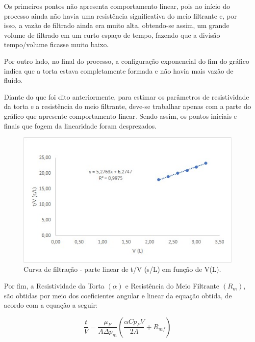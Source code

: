 Os primeiros pontos não apresenta comportamento linear, pois no início do processo ainda não havia uma resistência significativa do meio filtrante e, por isso, a vazão de filtrado ainda era muito alta, obtendo-se assim, um grande volume de filtrado em um curto espaço de tempo, fazendo que a divisão tempo/volume ficasse muito baixo.

Por outro lado, no final do processo, a configuração exponencial do fim do gráfico indica que a torta estava completamente formada e não havia mais vazão de fluido. 

Diante do que foi dito anteriormente, para estimar os parâmetros de resistividade da torta e a resistência do meio filtrante, deve-se trabalhar apenas com a parte do gráfico que apresente comportamento linear. Sendo assim, os pontos iniciais e finais que fogem da linearidade foram desprezados.

\begin{figure}[H]
	\begin{center}
		\includegraphics[scale=1,trim={0 0 0 0}]{figuras/ladeq/filtra/graph2}
		\caption{Curva de filtração - parte linear de t/V (s/L) em função de V(L).}
		\label{apaTeo}
	\end{center}
\end{figure}



Por fim, a  Resistividade da Torta $(\alpha)$ e Resistência do Meio Filtrante $(R_m)$, são obtidas por meio dos coeficientes angular e linear da equação obtida, de acordo com a equação a seguir:  


\begin{equation}\label{key}
\frac{t}{V}=\frac{\mu_{F}}{A \Delta p_{m}}\left(\frac{\alpha C p_{F} V}{2 A}+R_{m f}\right)
\end{equation}

